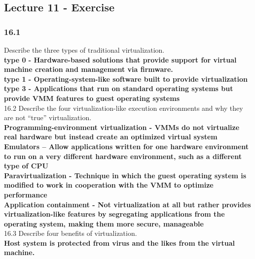 \documentclass[a4paper,10pt,titlepage]{report}
\begin{document}
\subsection{Lecture 11 - Exercise}

\subsubsection{16.1} Describe the three types of traditional virtualization. \\
\hspace{10mm} \textbf{type 0 - Hardware-based solutions that provide support for virtual machine creation and management via firmware.} \\
\hspace{10mm} \textbf{type 1 - Operating-system-like software built to provide
virtualization} \\
\hspace{10mm} \textbf{type 3 - Applications that run on standard operating systems but provide VMM features to guest operating systems} \\


16.2 Describe the four virtualization-like execution environments and why they are not “true” virtualization. \\
\hspace{10mm} \textbf{Programming-environment virtualization - VMMs do not virtualize real
hardware but instead create an optimized virtual system} \\
\hspace{10mm} \textbf{Emulators – Allow applications written for one hardware environment to
run on a very different hardware environment, such as a different type of
CPU} \\
\hspace{10mm} \textbf{Paravirtualization - Technique in which the guest operating system is
modified to work in cooperation with the VMM to optimize performance} \\
\hspace{10mm} \textbf{Application containment - Not virtualization at all but rather provides
virtualization-like features by segregating applications from the operating
system, making them more secure, manageable} \\



16.3 Describe four benefits of virtualization. \\
\hspace{10mm} \textbf{Host system is protected from virus and the likes from the virtual machine.} \\
\end{document}

